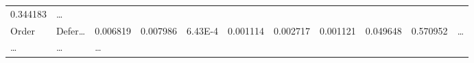 \documentclass[
]{article}
\begin{document}
\begin{longtable}[]{@{}lllllllllll@{}}
\begin{minipage}[t]{0.06\columnwidth}
0.344183\strut
\end{minipage} & \begin{minipage}[t]{0.03\columnwidth}\raggedright
\ldots{}\strut
\end{minipage}\tabularnewline
\begin{minipage}[t]{0.06\columnwidth}\raggedright
Order\strut
\end{minipage} & \begin{minipage}[t]{0.06\columnwidth}\raggedright
Defer\ldots{}\strut
\end{minipage} & \begin{minipage}[t]{0.09\columnwidth}\raggedright
0.006819\strut
\end{minipage} & \begin{minipage}[t]{0.06\columnwidth}\raggedright
0.007986\strut
\end{minipage} & \begin{minipage}[t]{0.09\columnwidth}\raggedright
6.43E-4\strut
\end{minipage} & \begin{minipage}[t]{0.06\columnwidth}\raggedright
0.001114\strut
\end{minipage} & \begin{minipage}[t]{0.09\columnwidth}\raggedright
0.002717\strut
\end{minipage} & \begin{minipage}[t]{0.06\columnwidth}\raggedright
0.001121\strut
\end{minipage} & \begin{minipage}[t]{0.06\columnwidth}\raggedright
0.049648\strut
\end{minipage} & \begin{minipage}[t]{0.06\columnwidth}\raggedright
0.570952\strut
\end{minipage} & \begin{minipage}[t]{0.03\columnwidth}\raggedright
\ldots{}\strut
\end{minipage}\tabularnewline
\begin{minipage}[t]{0.06\columnwidth}\raggedright
\ldots{}\strut
\end{minipage} & \begin{minipage}[t]{0.06\columnwidth}\raggedright
\ldots{}\strut
\end{minipage} & \begin{minipage}[t]{0.09\columnwidth}\raggedright
\ldots{}\strut
\end{minipage} & \begin{minipage}[t]{0.06\columnwidth}\raggedright

\end{minipage}
\end{longtable}
\end{document}

